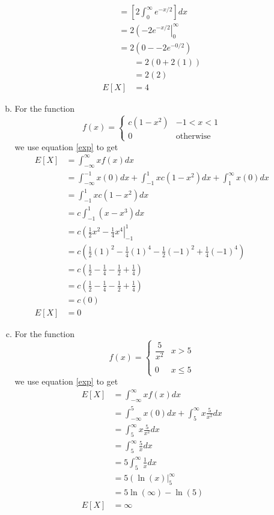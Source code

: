 \documentclass[11pt]{article}
\begin{document}
\begin{enumerate}
\begin{enumerate}[(a)]
\begin{align*}
&=\left[2\int_{0}^{\infty}e^{-x/2}\right] dx\\
&=2\left(-2e^{-x/2}\right|_{0}^{\infty} \\
&=2\left(0--2e^{-0/2}\right)
\end{align*}
\begin{align*}
&=2\left(0+2(1)\right)\\
&=2\left(2\right)\\
E[X]&=4
\end{align*}
\item
For the function
$$f(x) = \left\{\begin{array}{lc}
		c(1-x^2) & -1< x< 1\\
		0	& \mbox{otherwise}
		\end{array}\right.$$
we use equation \ref{exp} to get
\begin{align*}
E[X] &= \int_{-\infty}^{\infty}xf(x)dx \\
&= \int_{-\infty}^{-1}x(0)dx + \int_{-1}^{1}xc(1-x^2)dx + \int_{1}^{\infty}x(0)dx \\
&= \int_{-1}^{1}xc(1-x^2)dx \\
&= c\int_{-1}^{1}(x-x^3)dx \\
&= c\left(\frac{1}{2}x^2-\frac{1}{4}x^4\right|_{-1}^{1}\\
&= c\left(\frac{1}{2}(1)^2-\frac{1}{4}(1)^4 - \frac{1}{2}(-1)^2+\frac{1}{4}(-1)^4\right)\\
&= c\left(\frac{1}{2}-\frac{1}{4} - \frac{1}{2}+\frac{1}{4}\right)\\
&= c\left(\frac{1}{2}-\frac{1}{4} - \frac{1}{2}+\frac{1}{4}\right)\\
&= c\left(0\right)\\
E[X] &= 0
\end{align*}
\item
For the function
$$f(x) = \left\{\begin{array}{lc}
		\dfrac{5}{x^2} & x>5\\
\\
		0	& x\le 5
		\end{array}\right.$$
we use equation \ref{exp} to get
\begin{align*}
E[X] &= \int_{-\infty}^{\infty}xf(x)dx\\
&= \int_{-\infty}^{5}x(0)dx + \int_{5}^{\infty}x\frac{5}{x^2}dx\\
&= \int_{5}^{\infty}x\frac{5}{x^2}dx\\
&= \int_{5}^{\infty}\frac{5}{x}dx\\
&= 5\int_{5}^{\infty}\frac{1}{x}dx\\
&= 5\left(\ln(x)\right|_{5}^{\infty}\\
&= 5\left.\ln(\infty)-\ln(5)\right.\\
E[X]&= \infty
\end{align*}
\end{enumerate}


\end{enumerate}
\end{document}
